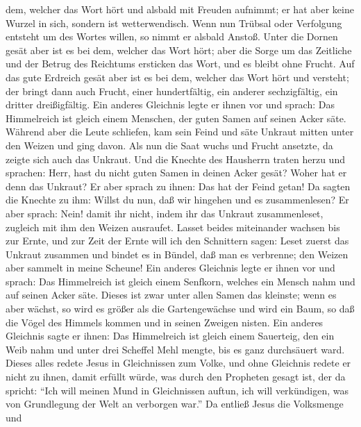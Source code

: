 dem, welcher das Wort hört und alsbald mit Freuden aufnimmt;
 er hat aber keine Wurzel in sich, sondern ist
wetterwendisch. Wenn nun Trübsal oder Verfolgung entsteht um des Wortes
willen, so nimmt er alsbald Anstoß.  Unter die Dornen
gesät aber ist es bei dem, welcher das Wort hört; aber die Sorge um das
Zeitliche und der Betrug des Reichtums ersticken das Wort, und es bleibt
ohne Frucht.  Auf das gute Erdreich gesät aber ist es bei
dem, welcher das Wort hört und versteht; der bringt dann auch Frucht,
einer hundertfältig, ein anderer sechzigfältig, ein dritter
dreißigfältig.  Ein anderes Gleichnis legte er ihnen vor
und sprach: Das Himmelreich ist gleich einem Menschen, der guten Samen
auf seinen Acker säte.  Während aber die Leute schliefen,
kam sein Feind und säte Unkraut mitten unter den Weizen und ging davon.
 Als nun die Saat wuchs und Frucht ansetzte, da zeigte
sich auch das Unkraut.  Und die Knechte des Hausherrn
traten herzu und sprachen: Herr, hast du nicht guten Samen in deinen
Acker gesät? Woher hat er denn das Unkraut?  Er aber
sprach zu ihnen: Das hat der Feind getan! Da sagten die Knechte zu ihm:
Willst du nun, daß wir hingehen und es zusammenlesen?  Er
aber sprach: Nein! damit ihr nicht, indem ihr das Unkraut zusammenleset,
zugleich mit ihm den Weizen ausraufet.  Lasset beides
miteinander wachsen bis zur Ernte, und zur Zeit der Ernte will ich den
Schnittern sagen: Leset zuerst das Unkraut zusammen und bindet es in
Bündel, daß man es verbrenne; den Weizen aber sammelt in meine Scheune!
 Ein anderes Gleichnis legte er ihnen vor und sprach: Das
Himmelreich ist gleich einem Senfkorn, welches ein Mensch nahm und auf
seinen Acker säte.  Dieses ist zwar unter allen Samen das
kleinste; wenn es aber wächst, so wird es größer als die Gartengewächse
und wird ein Baum, so daß die Vögel des Himmels kommen und in seinen
Zweigen nisten.  Ein anderes Gleichnis sagte er ihnen:
Das Himmelreich ist gleich einem Sauerteig, den ein Weib nahm und unter
drei Scheffel Mehl mengte, bis es ganz durchsäuert ward. 
Dieses alles redete Jesus in Gleichnissen zum Volke, und ohne Gleichnis
redete er nicht zu ihnen,  damit erfüllt würde, was durch
den Propheten gesagt ist, der da spricht: ``Ich will meinen Mund in
Gleichnissen auftun, ich will verkündigen, was von Grundlegung der Welt
an verborgen war.''  Da entließ Jesus die Volksmenge und
